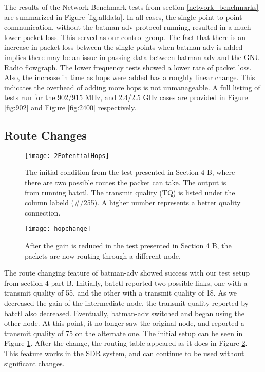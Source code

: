 The results of the Network Benchmark tests from section \ref{network_benchmarks} are summarized in Figure \ref{fig:alldata}. In all cases, the single point to point communication, without the batman-adv protocol running, resulted in a much lower packet loss. This served as our control group. The fact that there is an increase in packet loss between the single points when batman-adv is added implies there may be an issue in passing data between batman-adv and the GNU Radio flowgraph. The lower frequency tests showed a lower rate of packet loss. Also, the increase in time as hops were added has a roughly linear change. This indicates the overhead of adding more hops is not unmanageable. A full listing of tests run for the 902/915 MHz, and 2.4/2.5 GHz cases are provided in Figure \ref{fig:902} and Figure \ref{fig:2400} respectively. 

\subsection{Route Changes}

\begin{figure}
	\centering
	\texttt{[image: 2PotentialHops]}
	\caption{The initial condition from the test presented in Section 4 B, where there are two possible routes the packet can take. The output is from running batctl. The transmit quality (TQ) is listed under the column labeld (\#/255). A higher number represents a better quality connection.}
	\label{fig:2Hops}
\end{figure}

\begin{figure}
	\centering
	\texttt{[image: hopchange]}
	\caption{After the gain is reduced in the test presented in Section 4 B, the packets are now routing through a different node.}
	\label{fig:NewHop}
\end{figure}

The route changing feature of batman-adv showed success with our test setup from section 4 part B. Initially, batctl reported two possible links, one with a transmit quality of 55, and the other with a transmit quality of 18. As we decreased the gain of the intermediate node, the transmit quality reported by batctl also decreased. Eventually, batman-adv switched and began using the other node. At this point, it no longer saw the original node, and reported a transmit quality of 75 on the alternate one. The initial setup can be seen in Figure \ref{fig:2Hops}. After the change, the routing table appeared as it does in Figure \ref{fig:NewHop}. This feature works in the SDR system, and can continue to be used without significant changes.

